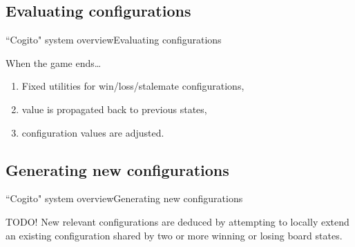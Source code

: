 \subsection{Evaluating configurations}
\begin{frame}{``Cogito" system overview}{Evaluating configurations}

\begin{block}{When the game ends\ldots}
\begin{enumerate}
\item Fixed utilities for win/loss/stalemate configurations,
\item value is propagated back to previous states,
\item configuration values are adjusted.
\end{enumerate}
\end{block}


\end{frame}

\subsection{Generating new configurations}
\begin{frame}{``Cogito" system overview}{Generating new configurations}

TODO!
New relevant configurations are deduced by attempting to locally extend an 
existing configuration shared by two or more winning or losing board states.

\end{frame}

